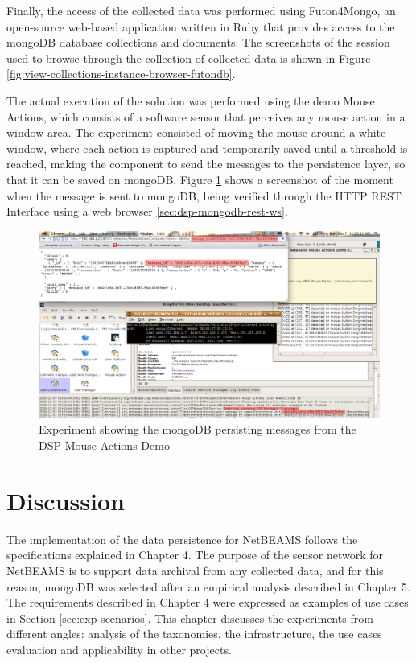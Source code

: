 Finally, the access of the collected data was performed using Futon4Mongo,
an open-source web-based application written in Ruby that provides access to the
mongoDB database collections and documents. The screenshots of the session used
to browse through the collection of collected data is shown in Figure
\ref{fig:view-collections-instance-browser-futondb}.

The actual execution of the solution was performed using the demo Mouse
Actions, which consists of a software sensor that perceives any mouse action in
a window area. The experiment consisted of moving the mouse around a white
window, where each action is captured and temporarily saved until a threshold is
reached, making the component to send the messages to the persistence layer, so
that it can be saved on mongoDB. Figure \ref{fig:experiment-mouseactions-dsp}
shows a screenshot of the moment when the message is sent to mongoDB, being
verified through the HTTP REST Interface using a web browser
\ref{sec:dsp-mongodb-rest-ws}.

\begin{figure}[h]
  \centering
  \includegraphics[scale=0.4]{../diagrams/experiment-mouseactions-dsp}
  \caption{Experiment showing the mongoDB persisting messages from the DSP
  Mouse Actions Demo}
  \label{fig:experiment-mouseactions-dsp}
\end{figure}

\section{Discussion}

The implementation of the data persistence for NetBEAMS follows the
specifications explained in Chapter 4. The purpose of the sensor network for
NetBEAMS is to support data archival from any collected data, and for this
reason, mongoDB was selected after an empirical analysis described in Chapter
5. The requirements described in Chapter 4 were expressed as examples of use
cases in Section \ref{sec:exp-scenarios}. This chapter discusses the
experiments from different angles: analysis of the taxonomies, the
infrastructure, the use cases evaluation and applicability in other projects.

